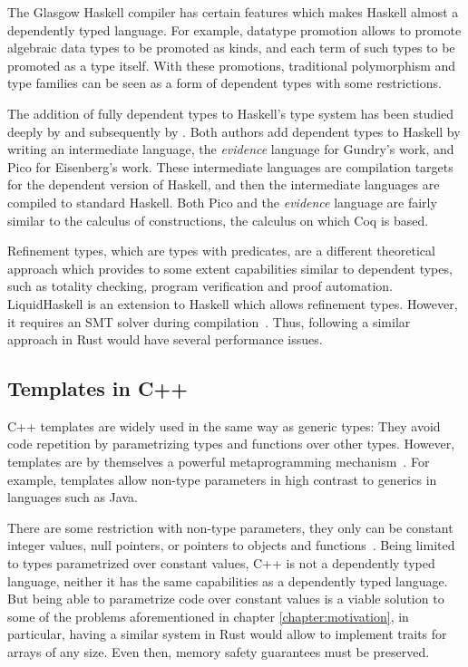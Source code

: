 The Glasgow Haskell compiler has certain features which makes Haskell almost a
dependently typed language. For example, datatype promotion allows to promote
algebraic data types to be promoted as kinds, and each term of such types to be
promoted as a type itself. With these promotions, traditional polymorphism and
type families can be seen as a form of dependent types with some restrictions.

The addition of fully dependent types to Haskell's type system has been studied
deeply by \citet{gundry} and subsequently by \citet{eisenberg}.  Both authors
add dependent types to Haskell by writing an intermediate language, the
\textit{evidence} language for Gundry's work, and Pico for Eisenberg's work.
These intermediate languages are compilation targets for the dependent version
of Haskell, and then the intermediate languages are compiled to standard
Haskell. Both Pico and the \textit{evidence} language are fairly similar to the
calculus of constructions, the calculus on which Coq is based.

Refinement types, which are types with predicates, are a different theoretical
approach which provides to some extent capabilities similar to dependent types,
such as totality checking, program verification and proof automation.
LiquidHaskell is an extension to Haskell which allows refinement types. However,
it requires an SMT solver during compilation~\cite{liquidhaskell}. Thus,
following a similar approach in Rust would have several performance issues.

\subsection{Templates in C++} 

C++ templates are widely used in the same way as generic types: They avoid code
repetition by parametrizing types and functions over other types. However,
templates are by themselves a powerful metaprogramming
mechanism~\cite{template_metaprogramming}. For example, templates allow non-type
parameters in high contrast to generics in languages such as Java.

There are some restriction with non-type parameters, they only can be constant
integer values, null pointers, or pointers to objects and
functions~\cite{templates}. Being limited to types parametrized over constant
values, C++ is not a dependently typed language, neither it has the same
capabilities as a dependently typed language. But being able to parametrize code
over constant values is a viable solution to some of the problems aforementioned
in chapter \ref{chapter:motivation}, in particular, having a similar system in
Rust would allow to implement traits for arrays of any size. Even then, memory
safety guarantees must be preserved.

